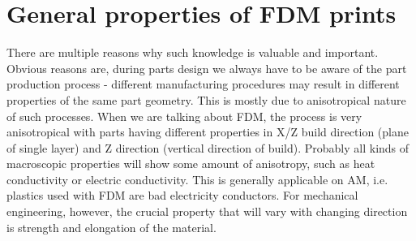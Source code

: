 \documentclass[a4paper, twoside, 11pt]{report}
\begin{document}
\section{General properties of FDM prints}
There are multiple reasons why such knowledge is valuable and important. Obvious reasons are, during parts design we always have to be aware of the part production process - different manufacturing procedures may result in different properties of the same part geometry. This is mostly due to anisotropical nature of such processes. When we are talking about FDM, the process is very anisotropical with parts having different properties in X/Z build direction (plane of single layer) and Z direction (vertical direction of build). Probably all kinds of macroscopic properties will show some amount of anisotropy, such as heat conductivity or electric conductivity. This is generally applicable on AM, i.e. plastics used with FDM are bad electricity conductors. For mechanical engineering, however, the crucial property that will vary with changing direction is strength and elongation of the material.\\
\end{document}
